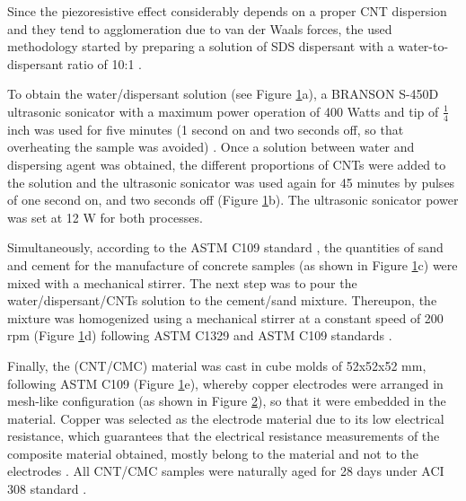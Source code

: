 \documentclass[twocolumn]{bmcart}%
\begin{document}
Since the piezoresistive effect considerably depends on a proper CNT dispersion and they tend to agglomeration due to van der Waals forces, the used methodology started by preparing a solution of SDS dispersant with a water-to-dispersant ratio of 10:1 \cite{Shao2017, Noh2013, Lee2017, Collins2012}.

To obtain the water/dispersant solution (see Figure \ref{fig1}a), a BRANSON S-450D ultrasonic sonicator  with a maximum power operation of 400 Watts and tip of $\frac{1}{4}$ inch was used for five minutes (1 second on and two seconds off, so that overheating the sample was  avoided) \cite{Konsta-gdoutos2010, Konsta-Gdoutos2014}. Once a solution between water and dispersing agent was obtained, the different proportions of CNTs were added to the solution and the ultrasonic sonicator was used again for 45 minutes by pulses of one second on, and two seconds off (Figure \ref{fig1}b). The ultrasonic sonicator power was set at 12 W for both processes.

\begin{figure}[h!]
  \caption{
      }
   \label{fig1}
      \end{figure}



Simultaneously, according to the ASTM C109 standard \cite{Qiao2012}, the quantities of sand and cement for the manufacture of concrete samples (as shown in Figure \ref{fig1}c) were mixed with a mechanical stirrer. The next step was to pour the water/dispersant/CNTs solution to the cement/sand mixture.  Thereupon, the mixture was homogenized using a mechanical stirrer at a constant speed of 200 rpm (Figure \ref{fig1}d) following ASTM C1329 and ASTM C109 standards \cite{Collins2012, AmericanSocietyforTestingandMaterials2014}.

\begin{figure}[h!]
  \caption{
  \label{fig2}
      }
      \end{figure}


Finally, the  (CNT/CMC) material was cast in cube molds of 52x52x52 mm, following ASTM C109 \cite{ASTMC1092000} (Figure \ref{fig1}e), whereby copper electrodes were arranged in mesh-like configuration (as shown in Figure \ref{fig2}), so that it were embedded in the material. Copper was selected as the electrode material due to its low electrical resistance, which guarantees that the electrical resistance measurements of the composite material obtained, mostly belong to the material and not to the electrodes \cite{Kim2016}. All CNT/CMC samples were naturally aged for 28 days under ACI 308 standard \cite{ACICommittee3082016}.
\end{document}
